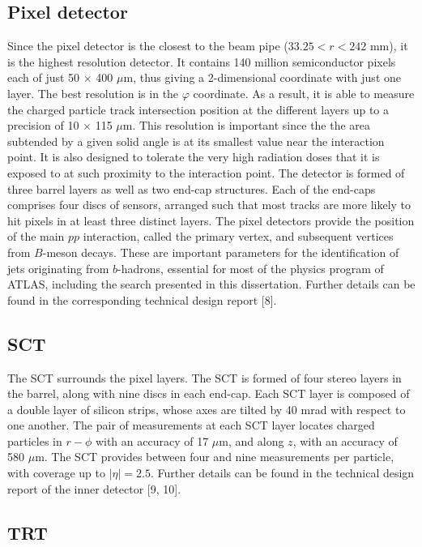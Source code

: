 \subsection*{Pixel detector}
Since the pixel detector is the closest to the beam pipe ($33.25 < r <242$ mm), it is
the highest resolution detector. It contains 140 million semiconductor pixels each of just
50 $\times$ 400 $\mu$m, 
thus giving a 2-dimensional coordinate with just one layer. The best resolution is in the $\varphi$ coordinate. 
As a result, it is able to measure the charged particle track intersection 
position at the different layers  up
to a precision of 10 $\times$ 115 $\mu$m.
This resolution is important since the 
the area subtended by a given solid angle is at its smallest value near the interaction point.
 It is also designed to tolerate the very high radiation
doses that it is exposed to at such proximity to the interaction point. The detector is
formed of three barrel layers as well as two end-cap structures. Each of the end-caps
comprises four discs of sensors, arranged such that most tracks are more likely to hit pixels in at
least three distinct layers.
The pixel detectors provide the position of the main $pp$
interaction, called the primary vertex, and subsequent vertices from 
$B$-meson decays. These are important parameters for the identification of jets originating from $b$-hadrons,
essential for most of the physics program of ATLAS, including the search presented in this dissertation. 
 Further details can be found in the corresponding technical design report [8].


\subsection*{SCT}

The SCT surrounds the pixel layers.
The SCT is formed of four stereo layers in the barrel,
along with nine discs in each end-cap. 
Each SCT layer is composed of a double layer of silicon
strips, whose axes are tilted by 40 mrad with respect to one another. The pair of measurements at
each SCT layer locates charged particles in $r - \phi$ with an accuracy of 17 $\mu$m, 
and along $z$, with an accuracy of 580 $\mu$m.
The SCT provides between four and nine measurements per particle, with
coverage up to $|\eta|=2.5$.
Further details can be found in the technical design report of the inner
detector [9, 10].

         
\subsection*{TRT}


